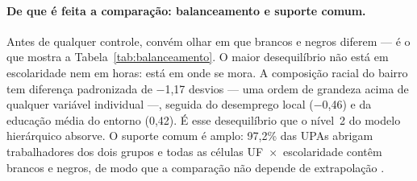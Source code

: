 \documentclass[11pt, a4paper, oneside]{article}
\begin{document}
\paragraph{De que é feita a comparação: balanceamento e suporte comum.}
Antes de qualquer controle, convém olhar em que brancos e negros diferem --- é o que
mostra a Tabela~\ref{tab:balanceamento}. O maior desequilíbrio não está em escolaridade
nem em horas: está em {onde se mora}. A composição racial do bairro tem diferença
padronizada de −1,17 desvios --- uma ordem de grandeza acima de qualquer variável
individual ---, seguida do desemprego local (−0,46) e da educação média do entorno
(0,42). É esse desequilíbrio que o nível~2 do modelo hierárquico absorve.
O suporte comum é amplo: 97,2\% das UPAs abrigam trabalhadores dos dois
grupos e todas as células UF~$\times$~escolaridade contêm brancos e negros, de modo que a
comparação não depende de extrapolação \cite{angrist2009}.
\end{document}
